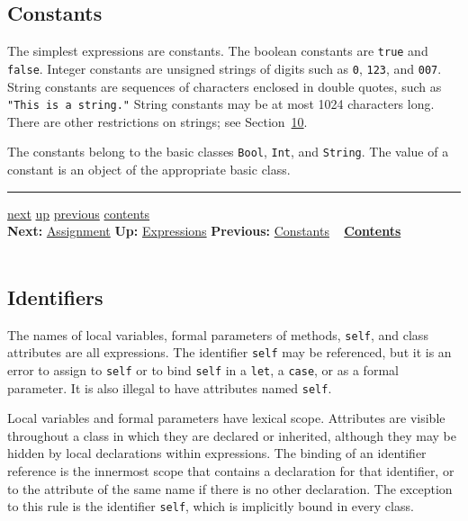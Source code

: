 \documentclass[]{article}
\begin{document}
\subsection{Constants}

The simplest expressions are constants. The boolean constants are
\texttt{true} and \texttt{false}. Integer constants are unsigned strings
of digits such as \texttt{0}, \texttt{123}, and \texttt{007}. String
constants are sequences of characters enclosed in double quotes, such as
\texttt{"This is a string."} String constants may be at most 1024
characters long. There are other restrictions on strings; see
Section~\href{node33.html\#lex-struct}{10}.

The constants belong to the basic classes \texttt{Bool}, \texttt{Int},
and \texttt{String}. The value of a constant is an object of the
appropriate basic class.

\begin{center}\rule{3in}{0.4pt}\end{center}

\href{node16.html}{next} \href{node13.html}{up}
\href{node14.html}{previous} \href{node1.html}{contents} \\
\textbf{Next:} \href{node16.html}{Assignment} \textbf{Up:}
\href{node13.html}{Expressions} \textbf{Previous:}
\href{node14.html}{Constants} ~ \textbf{\href{node1.html}{Contents}} \\
\\

\subsection{Identifiers}

The names of local variables, formal parameters of methods,
\texttt{self}, and class attributes are all expressions. The identifier
\texttt{self} may be referenced, but it is an error to assign to
\texttt{self} or to bind \texttt{self} in a \texttt{let}, a
\texttt{case}, or as a formal parameter. It is also illegal to have
attributes named \texttt{self}.

Local variables and formal parameters have lexical scope. Attributes are
visible throughout a class in which they are declared or inherited,
although they may be hidden by local declarations within expressions.
The binding of an identifier reference is the innermost scope that
contains a declaration for that identifier, or to the attribute of the
same name if there is no other declaration. The exception to this rule
is the identifier \texttt{self}, which is implicitly bound in every
class.
\end{document}
